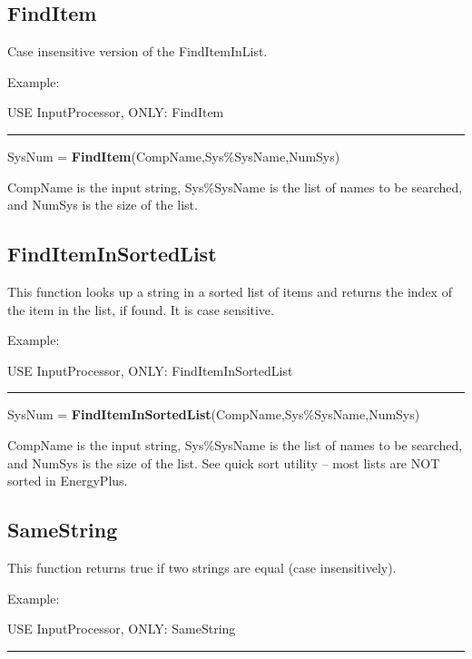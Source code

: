 \subsection{FindItem}\label{finditem}

Case insensitive version of the FindItemInList.

Example:

USE InputProcessor, ONLY: FindItem

\begin{center}\rule{0.5\linewidth}{\linethickness}\end{center}

SysNum = \textbf{FindItem}(CompName,Sys\%SysName,NumSys)

CompName is the input string, Sys\%SysName is the list of names to be searched, and NumSys is the size of the list.

\subsection{FindItemInSortedList}\label{finditeminsortedlist}

This function looks up a string in a sorted list of items and returns the index of the item in the list, if found. It is case sensitive.

Example:

USE InputProcessor, ONLY: FindItemInSortedList

\begin{center}\rule{0.5\linewidth}{\linethickness}\end{center}

SysNum = \textbf{FindItemInSortedList}(CompName,Sys\%SysName,NumSys)

CompName is the input string, Sys\%SysName is the list of names to be searched, and NumSys is the size of the list. See quick sort utility -- most lists are NOT sorted in EnergyPlus.

\subsection{SameString}\label{samestring}

This function returns true if two strings are equal (case insensitively).

Example:

USE InputProcessor, ONLY: SameString

\begin{center}\rule{0.5\linewidth}{\linethickness}\end{center}

